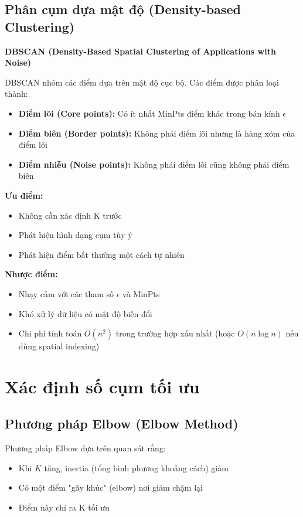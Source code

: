\subsection{Phân cụm dựa mật độ (Density-based Clustering)}

\textbf{DBSCAN (Density-Based Spatial Clustering of Applications with Noise)}

DBSCAN \cite{dbscan} nhóm các điểm dựa trên mật độ cục bộ. Các điểm được phân loại thành:
\begin{itemize}
    \item \textbf{Điểm lõi (Core points):} Có ít nhất MinPts điểm khác trong bán kính $\epsilon$
    \item \textbf{Điểm biên (Border points):} Không phải điểm lõi nhưng là hàng xóm của điểm lõi
    \item \textbf{Điểm nhiễu (Noise points):} Không phải điểm lõi cũng không phải điểm biên
\end{itemize}

\textbf{Ưu điểm:}
\begin{itemize}
    \item Không cần xác định K trước
    \item Phát hiện hình dạng cụm tùy ý
    \item Phát hiện điểm bất thường một cách tự nhiên
\end{itemize}

\textbf{Nhược điểm:}
\begin{itemize}
    \item Nhạy cảm với các tham số $\epsilon$ và MinPts
    \item Khó xử lý dữ liệu có mật độ biến đổi
    \item Chi phí tính toán $O(n^2)$ trong trường hợp xấu nhất (hoặc $O(n \log n)$ nếu dùng spatial indexing)
\end{itemize}

\section{Xác định số cụm tối ưu}

\subsection{Phương pháp Elbow (Elbow Method)}

Phương pháp Elbow dựa trên quan sát rằng:
\begin{itemize}
    \item Khi $K$ tăng, inertia (tổng bình phương khoảng cách) giảm
    \item Có một điểm "gãy khúc" (elbow) nơi giảm chậm lại
    \item Điểm này chỉ ra K tối ưu
\end{itemize}

